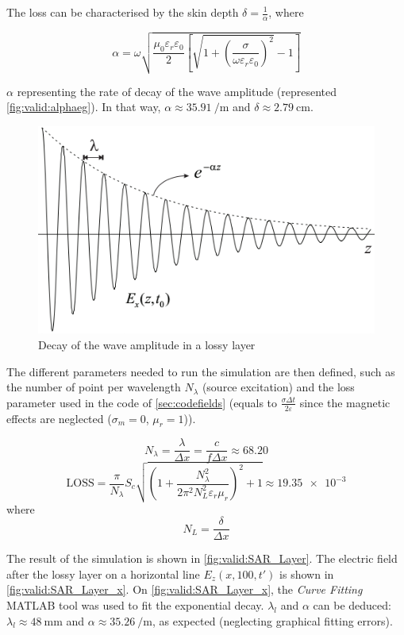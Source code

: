 The loss can be characterised by the skin depth $\delta = \frac{1}{\alpha}$, where

\begin{equation}
\alpha = \omega\sqrt{\frac{\mu_0\varepsilon_r\varepsilon_0}{2}\left[\sqrt{1+\left(\frac{\sigma}{\omega\varepsilon_r\varepsilon_0}\right)^2}-1\right]}
\end{equation}

$\alpha$ representing the rate of decay of the wave amplitude (represented \autoref{fig:valid:alphaeg}). In that way, $\alpha\approx\SI{35.91}{\per\meter}$ and $\delta\approx\SI{2.79}{\centi\meter}$.

\begin{figure}[H]
\centering
    \includegraphics[width=.7\textwidth]{img/alpha}
     \caption{Decay of the wave amplitude in a lossy layer}
     \label{fig:valid:alphaeg}
\end{figure}

The different parameters needed to run the simulation are then defined, such as the number of point per wavelength $N_\lambda$ (source excitation) and the loss parameter used in the code of \autoref{sec:codefields} (equals to $\frac{\sigma\Delta t}{2\varepsilon}$ since the magnetic effects are neglected ($\sigma_m=0$, $\mu_r= 1$)).

\begin{equation}
N_\lambda=\frac{\lambda}{\Delta x} = \frac{c}{f\Delta x} \approx \num{68.20}
\end{equation}
\begin{equation}
\text{LOSS} = \frac{\pi}{N_\lambda}S_c\sqrt{\left(1+\frac{N_\lambda^2}{2\pi^2N_L^2\varepsilon_r\mu_r}\right)^2 +1} \approx\num{19.35e-3}
\end{equation} 
where
\begin{equation}
N_L = \frac{\delta}{\Delta x}
\end{equation}

The result of the simulation is shown in \autoref{fig:valid:SAR_Layer}. The electric field after the lossy layer on a horizontal line $E_z(x,100,t')$ is shown in  \autoref{fig:valid:SAR_Layer_x}. On \autoref{fig:valid:SAR_Layer_x}, the \emph{Curve Fitting} MATLAB tool was used to fit the exponential decay. $\lambda_l$ and $\alpha$ can be deduced: $\lambda_l\approx\SI{48}{\milli\meter}$ and $\alpha\approx \SI{35.26}{\per\meter}$, as expected (neglecting graphical fitting errors).

